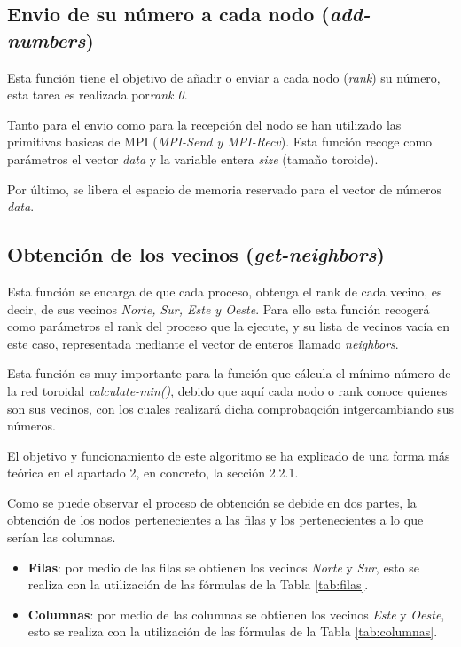 \documentclass[11pt]{article}
\begin{document}





\subsection{Envio de su número a cada nodo (\textit{add-numbers})}
Esta función tiene el objetivo de añadir o enviar a cada nodo (\textit{rank}) su número, esta tarea es realizada por\textit{rank 0}.

Tanto para el envio como para la recepción del nodo se han utilizado las primitivas basicas de MPI (\textit{MPI-Send y MPI-Recv}).
Esta función recoge como parámetros el vector \textit{data} y la variable entera \textit{size} (tamaño toroide).



Por último, se libera el espacio de memoria reservado para el vector de números \textit{data}.


\subsection{Obtención de los vecinos (\textit{get-neighbors})}
Esta función se encarga de que cada proceso, obtenga el rank de cada vecino, es decir, de sus vecinos \textit{Norte, Sur, Este y Oeste}. Para ello esta función recogerá como parámetros el rank del proceso que la ejecute, y su lista de vecinos vacía en este caso, representada mediante el vector de enteros llamado \textit{neighbors}.

Esta función es muy importante para la función que cálcula el mínimo número de la red toroidal \textit{calculate-min()}, debido que aquí cada nodo o rank conoce quienes son sus vecinos, con los cuales realizará dicha comprobaqción intgercambiando sus números.

El objetivo y funcionamiento de este algoritmo se ha explicado de una forma más teórica en el apartado 2, en concreto, la sección 2.2.1.



Como se puede observar el proceso de obtención se debide en dos partes, la obtención de los nodos pertenecientes a las filas y los pertenecientes a lo que serían las columnas.

\begin{itemize}
	\item \textbf{Filas}: por medio de las filas se obtienen los vecinos \textit{Norte} y \textit{Sur}, esto se realiza con la utilización de las fórmulas de la Tabla \ref{tab:filas}.
	\item \textbf{Columnas}: por medio de las columnas se obtienen los vecinos \textit{Este} y \textit{Oeste}, esto se realiza con la utilización de las fórmulas de la Tabla \ref{tab:columnas}.
\end{itemize}
\end{document}
